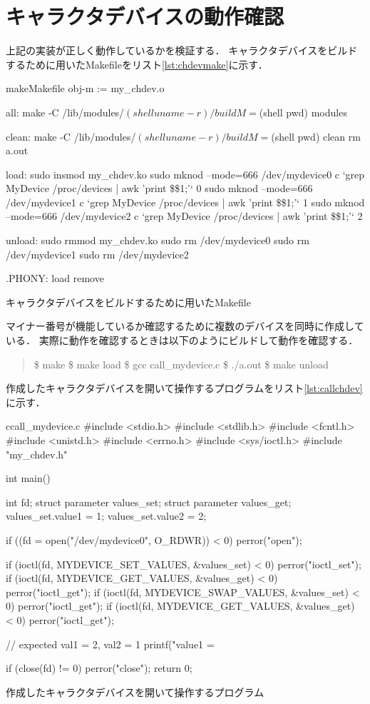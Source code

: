 \section{キャラクタデバイスの動作確認}
上記の実装が正しく動作しているかを検証する．
キャラクタデバイスをビルドするために用いたMakefileをリスト\ref{lst:chdevmake}に示す．
\begin{longlisting}
\begin{myminted}{make}{Makefile}
obj-m := my_chdev.o

all:
	make -C /lib/modules/$(shell uname -r)/build M=$(shell pwd) modules

clean:
	make -C /lib/modules/$(shell uname -r)/build M=$(shell pwd) clean
	rm a.out

load:
	sudo insmod my_chdev.ko
	sudo mknod --mode=666 /dev/mydevice0 c `grep MyDevice /proc/devices | awk '{print \$\$1;}'` 0
	sudo mknod --mode=666 /dev/mydevice1 c `grep MyDevice /proc/devices | awk '{print \$\$1;}'` 1
	sudo mknod --mode=666 /dev/mydevice2 c `grep MyDevice /proc/devices | awk '{print \$\$1;}'` 2

unload:
	sudo rmmod my_chdev.ko
	sudo rm /dev/mydevice0
	sudo rm /dev/mydevice1
	sudo rm /dev/mydevice2


.PHONY: load remove
\end{myminted}
\caption{キャラクタデバイスをビルドするために用いたMakefile}
\label{lst:chdevmake}
\end{longlisting}

マイナー番号が機能しているか確認するために複数のデバイスを同時に作成している．
実際に動作を確認するときは以下のようにビルドして動作を確認する．
\begin{quote}
\$ make
\$ make load
\$ gcc call_mydevice.c
\$ ./a.out
\$ make unload
\end{quote}

作成したキャラクタデバイスを開いて操作するプログラムをリスト\ref{lst:callchdev}に示す．
\begin{longlisting}
\begin{myminted}{c}{call_mydevice.c}
#include <stdio.h>
#include <stdlib.h>
#include <fcntl.h>
#include <unistd.h>
#include <errno.h>
#include <sys/ioctl.h>
#include "my_chdev.h"

int main() {
    int fd;
    struct parameter values_set;
    struct parameter values_get;
    values_set.value1 = 1;
    values_set.value2 = 2;

    if ((fd = open("/dev/mydevice0", O_RDWR)) < 0) perror("open");

    if (ioctl(fd, MYDEVICE_SET_VALUES, &values_set) < 0) perror("ioctl_set");
    if (ioctl(fd, MYDEVICE_GET_VALUES, &values_get) < 0) perror("ioctl_get");
    if (ioctl(fd, MYDEVICE_SWAP_VALUES, &values_set) < 0) perror("ioctl_get");
    if (ioctl(fd, MYDEVICE_GET_VALUES, &values_get) < 0) perror("ioctl_get");

    // expected val1 = 2, val2 = 1
    printf("value1 = %

    if (close(fd) != 0) perror("close");
    return 0;
}
\end{myminted}
\caption{作成したキャラクタデバイスを開いて操作するプログラム}
\label{lst:callchdev}
\end{longlisting}

